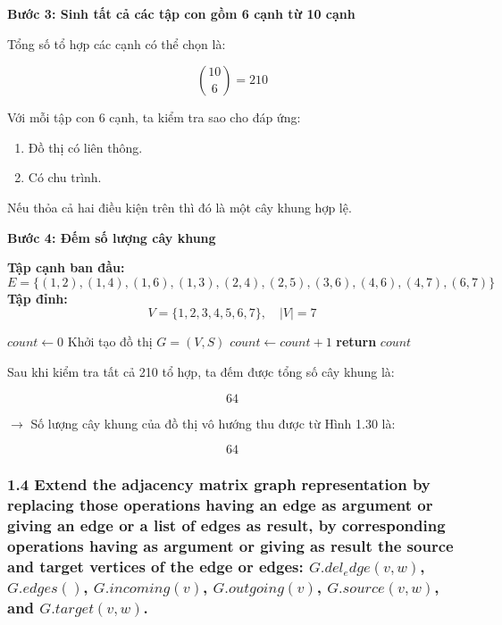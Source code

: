 \documentclass{article}
\begin{document}
	\vspace{1em}
	\textbf{Bước 3: Sinh tất cả các tập con gồm 6 cạnh từ 10 cạnh}
	
	Tổng số tổ hợp các cạnh có thể chọn là:
	
	\[
	\binom{10}{6} = 210
	\]
	
	Với mỗi tập con 6 cạnh, ta kiểm tra sao cho đáp ứng:
	\begin{enumerate}
		\item Đồ thị có liên thông.
		\item Có chu trình.
	\end{enumerate}
	
	Nếu thỏa cả hai điều kiện trên thì đó là một cây khung hợp lệ.
	
	\vspace{1em}
	\textbf{Bước 4: Đếm số lượng cây khung}
	
	\textbf{Tập cạnh ban đầu:}
	\[
	E = \{
	(1, 2), (1, 4), (1, 6), (1, 3),
	(2, 4), (2, 5),
	(3, 6), (4, 6), (4, 7), (6, 7)
	\}
	\]
	\textbf{Tập đỉnh:}
	\[
	V = \{1, 2, 3, 4, 5, 6, 7\}, \quad |V| = 7
	\]
	
	\begin{algorithm}[H]
		\begin{algorithmic}[1]
			\State $count \gets 0$
			 
			\State Khởi tạo đồ thị $G = (V, S)$
			\State $count \gets count + 1$
			\EndIf
			\EndFor
			\State \textbf{return} $count$
		\end{algorithmic}
	\end{algorithm}
	
	Sau khi kiểm tra tất cả 210 tổ hợp, ta đếm được tổng số cây khung là:
	
	\[
	\boxed{64}
	\]
	
	\vspace{1em}
	$\rightarrow$ Số lượng cây khung của đồ thị vô hướng thu được từ Hình 1.30 là:
	
	\[
	\boxed{64}
	\]
	
	\subsubsection*{1.4 Extend the adjacency matrix graph representation by replacing those operations having an edge as argument or giving an edge or a list of edges as result, by corresponding operations having as argument or giving as result the source and target vertices of the edge or edges: $G.del_edge(v,w)$, $G.edges()$, $G.incoming(v)$, $G.outgoing(v)$, $G.source(v,w)$, and $G.target(v,w)$.}
	
\end{document}
